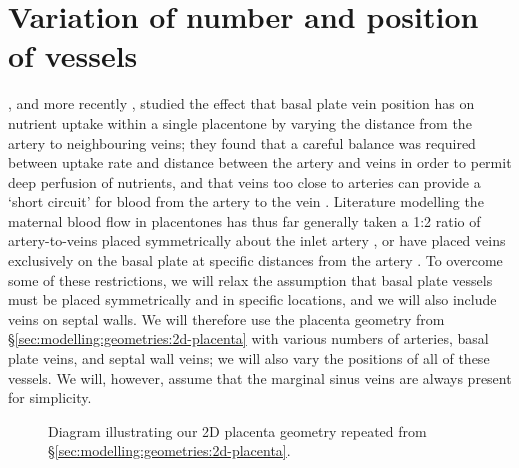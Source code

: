     \section{Variation of number and position of vessels} \label{sec:nutrient-uptake:variation-of-vessels}
        \citeauthor{chernyavskyMathematicalModelIntervillous2010} \cite{chernyavskyMathematicalModelIntervillous2010}, and more recently \citeauthor{meklerImpactTissuePorosity2022} \cite{meklerImpactTissuePorosity2022}, studied the effect that basal plate vein position has on nutrient uptake within a single placentone by varying the distance from the artery to neighbouring veins; they found that a careful balance was required between uptake rate and distance between the artery and veins in order to permit deep perfusion of nutrients, and that veins too close to arteries can provide a `short circuit' for blood from the artery to the vein \cite{chernyavskyMathematicalModelIntervillous2010,meklerImpactTissuePorosity2022}. Literature modelling the maternal blood flow in placentones has thus far generally taken a 1:2 ratio of artery-to-veins placed symmetrically about the inlet artery \cite{chernyavskyMathematicalModelIntervillous2010,lecarpentierComputationalFluidDynamic2016,erianMaternalPlacentalBlood1977}, or have placed veins exclusively on the basal plate at specific distances from the artery \cite{meklerImpactTissuePorosity2022}. To overcome some of these restrictions, we will relax the assumption that basal plate vessels must be placed symmetrically and in specific locations, and we will also include veins on septal walls. We will therefore use the placenta geometry from \S\ref{sec:modelling:geometries:2d-placenta} with various numbers of arteries, basal plate veins, and septal wall veins; we will also vary the positions of all of these vessels. We will, however, assume that the marginal sinus veins are always present for simplicity.

        \begin{figure}
            \centering
            
            \caption{Diagram illustrating our 2D placenta geometry repeated from \S\ref{sec:modelling:geometries:2d-placenta}.}
        \end{figure}
    
